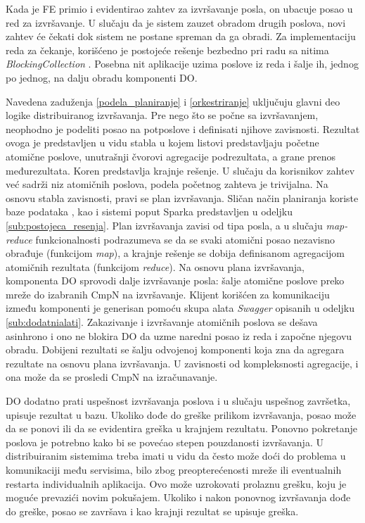 \documentclass[12pt,oneside]{memoir}
\begin{document}
Kada je FE primio i evidentirao zahtev za izvršavanje posla, on ubacuje posao u red za izvršavanje. U slučaju da je sistem zauzet obradom drugih poslova, novi zahtev će čekati dok sistem ne postane spreman da ga obradi. Za implementaciju reda za čekanje, korišćeno je postojeće rešenje bezbedno pri radu sa nitima \emph{BlockingCollection} \cite{BlockingCollection}. Posebna nit aplikacije uzima poslove iz reda i šalje ih, jednog po jednog, na dalju obradu komponenti DO.

Navedena zaduženja \ref{podela_planiranje} i \ref{orkestriranje} uključuju glavni deo logike distribuiranog izvršavanja. Pre nego što se počne sa izvršavanjem, neophodno je podeliti posao na potposlove i definisati njihove zavisnosti. Rezultat ovoga je predstavljen u vidu stabla u kojem listovi predstavljaju početne atomične poslove, unutrašnji čvorovi agregacije podrezultata, a grane prenos međurezultata. Koren predstavlja krajnje rešenje. U slučaju da korisnikov zahtev već sadrži niz atomičnih poslova, podela početnog zahteva je trivijalna. Na osnovu stabla zavisnosti, pravi se plan izvršavanja. Sličan način planiranja koriste baze podataka \cite{SQLServerInternals}, kao i sistemi poput Sparka \cite{Spark} predstavljen u odeljku \ref{sub:postojeca_resenja}. Plan izvršavanja zavisi od tipa posla, a u slučaju \emph{map-reduce} funkcionalnosti podrazumeva se da se svaki atomični posao nezavisno obrađuje (funkcijom \emph{map}), a krajnje rešenje se dobija definisanom agregacijom atomičnih rezultata (funkcijom \emph{reduce}). Na osnovu plana izvršavanja, komponenta DO sprovodi dalje izvršavanje posla: šalje atomične poslove preko mreže do izabranih CmpN na izvršavanje. Klijent korišćen za komunikaciju između komponenti je generisan pomoću skupa alata \emph{Swagger} opisanih u odeljku \ref{sub:dodatnialati}. Zakazivanje i izvršavanje atomičnih poslova se dešava asinhrono i ono ne blokira DO da uzme naredni posao iz reda i započne njegovu obradu. Dobijeni rezultati se šalju odvojenoj komponenti koja zna da agregara rezultate na osnovu plana izvršavanja. U zavisnosti od kompleksnosti agregacije, i ona može da se prosledi CmpN na izračunavanje.

DO dodatno prati uspešnost izvršavanja poslova i u slučaju uspešnog završetka, upisuje rezultat u bazu. Ukoliko dođe do greške prilikom izvršavanja, posao može da se ponovi ili da se evidentira greška u krajnjem rezultatu. Ponovno pokretanje poslova je potrebno kako bi se povećao stepen pouzdanosti izvršavanja. U distribuiranim sistemima treba imati u vidu da često može doći do problema u komunikaciji među servisima, bilo zbog preopterećenosti mreže ili eventualnih restarta individualnih aplikacija. Ovo može uzrokovati prolaznu grešku, koju je moguće prevazići novim pokušajem. Ukoliko i nakon ponovnog izvršavanja dođe do greške, posao se završava i kao krajnji rezultat se upisuje greška.
\end{document}
